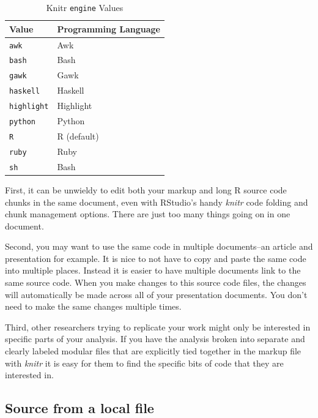 \begin{table}
    \caption{Knitr \texttt{engine} Values}
    \label{EngineOptions}
    \begin{tabular}{l p{2.25cm}}
    \hline\vspace{0.15cm}
    Value & Programming Language \\
    \hline\hline
    \texttt{awk} & Awk\index{Awk} \\
    \texttt{bash} & Bash\index{Bash} \\
    \texttt{gawk} & Gawk\index{Gawk} \\
    \texttt{haskell} & Haskell\index{Haskell} \\
    \texttt{highlight} & Highlight\index{Highlight, knitr engine option} \\ 
    \texttt{python} & Python\index{Python} \\
    \texttt{R} & R (default) \\[0.25cm]
    \texttt{ruby} & Ruby\index{Ruby} \\
    \texttt{sh} & Bash \\
    \hline
    \end{tabular}
\end{table}

First, it can be unwieldy to edit both your markup and long R source code chunks in the same document, even with RStudio's handy {\emph{knitr}} code folding and chunk management options. There are just too many things going on in one document. 

Second, you may want to use the same code in multiple documents--an article and presentation for example. It is nice to not have to copy and paste the same code into multiple places. Instead it is easier to have multiple documents link to the same source code. When you make changes to this source code files, the changes will automatically be made across all of your presentation documents. You don't need to make the same changes multiple times.

Third, other researchers trying to replicate your work might only be interested in specific parts of your analysis. If you have the analysis broken into separate and clearly labeled modular files that are explicitly tied together in the markup file with {\emph{knitr}} it is easy for them to find the specific bits of code that they are interested in.

\subsection{Source from a local file}

